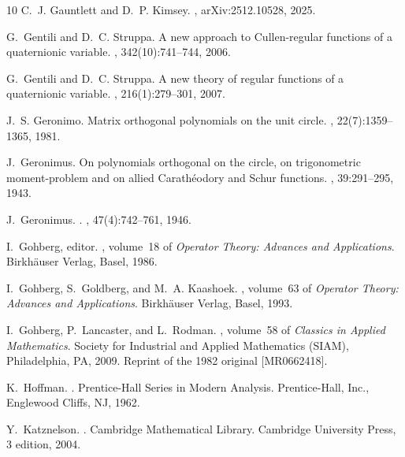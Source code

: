 \documentclass[11pt,reqno]{amsart}
\theoremstyle{definition}
\numberwithin{equation}{section}
\begin{document}
\begin{thebibliography}{10}
C.~J. Gauntlett and D.~P. Kimsey.
, 	arXiv:2512.10528, 2025.

G.~Gentili and D.~C. Struppa.
\newblock A new approach to {C}ullen-regular functions of a quaternionic
  variable.
, 342(10):741--744, 2006.

G.~Gentili and D.~C. Struppa.
\newblock A new theory of regular functions of a quaternionic variable.
, 216(1):279--301, 2007.

J.~S. Geronimo.
\newblock Matrix orthogonal polynomials on the unit circle.
, 22(7):1359--1365, 1981.

J.~Geronimus.
\newblock On polynomials orthogonal on the circle, on trigonometric
  moment-problem and on allied {C}arath\'{e}odory and {S}chur functions.
, 39:291--295, 1943.

J.~Geronimus.
.
, 47(4):742--761, 1946.

I.~Gohberg, editor.
,
  volume~18 of {\em Operator Theory: Advances and Applications}.
\newblock Birkh\"{a}user Verlag, Basel, 1986.

I.~Gohberg, S.~Goldberg, and M.~A. Kaashoek.
, volume~63 of {\em
  Operator Theory: Advances and Applications}.
\newblock Birkh\"{a}user Verlag, Basel, 1993.

I.~Gohberg, P.~Lancaster, and L.~Rodman.
, volume~58 of {\em Classics in Applied
  Mathematics}.
\newblock Society for Industrial and Applied Mathematics (SIAM), Philadelphia,
  PA, 2009.
\newblock Reprint of the 1982 original [MR0662418].

K.~Hoffman.
.
\newblock Prentice-Hall Series in Modern Analysis. Prentice-Hall, Inc.,
  Englewood Cliffs, NJ, 1962.

Y.~Katznelson.
.
\newblock Cambridge Mathematical Library. Cambridge University Press, 3
  edition, 2004.


\end{thebibliography}
\end{document}
